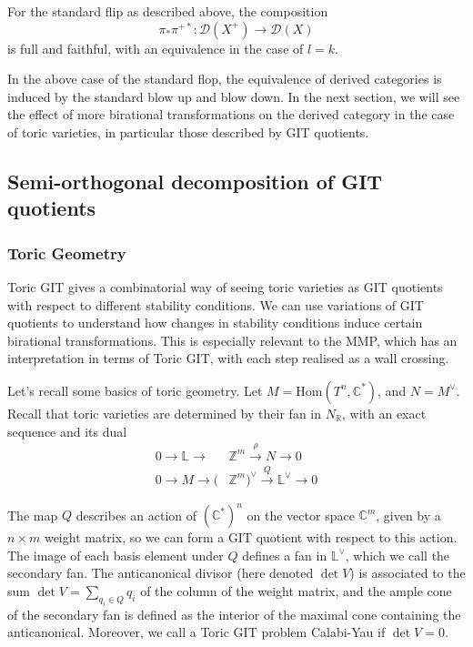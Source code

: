 \begin{theorem}{\cite{Huybrechts}}{}
    For the standard flip as described above, the composition $$
\pi_{*}\pi^{+*}: \mathcal{D}(X^+)\to \mathcal{D}(X)
$$ is full and faithful, with an equivalence in the case of $l =k$. 
\end{theorem}

In the above case of the standard flop, the equivalence of derived categories is induced by the standard blow up and blow down. In the next section, we will see the effect of more birational transformations on the derived category in the case of toric varieties, in particular those described by GIT quotients. 

\subsection{Semi-orthogonal decomposition of GIT quotients}

\subsubsection{Toric Geometry}

Toric GIT gives a combinatorial way of seeing toric varieties as GIT quotients with respect to different stability conditions. We can use variations of GIT quotients to understand how changes in stability conditions induce certain birational transformations. This is especially relevant to the MMP, which has an interpretation in terms of Toric GIT, with each step realised as a wall crossing.

Let's recall some basics of toric geometry. Let $M = \mathrm{Hom}(T^{n}, \mathbb{C}^*)$, and $N = M^{\vee}$. Recall that toric varieties are determined by their fan in $N_\mathbb{R}$, with an exact sequence and its dual
\begin{align*}
0 \to \mathbb{L}\to &\mathbb{Z}^{m}\xrightarrow{\rho}N \to 0 \\
0 \to M \to (&\mathbb{Z}^{m})^{\vee} \xrightarrow{Q} \mathbb{L}^{\vee}\to {0}
\end{align*}

The map $Q$ describes an action of $(\mathbb{C}^{*})^n$ on the vector space $\mathbb{C}^m$, given by a $n\times m$ weight matrix, so we can form a GIT quotient with respect to this action. The image of each basis element under $Q$ defines a fan in $\mathbb{L}^{\vee}$, which we call the secondary fan. The anticanonical divisor (here denoted $\det V$) is associated to the sum $\det V = \sum_{q_{i}\in Q}q_i$ of the column of the weight matrix, and the ample cone of the secondary fan is defined as the interior of the maximal cone containing the anticanonical. Moreover, we call a Toric GIT problem Calabi-Yau if $\det V = 0$.  

